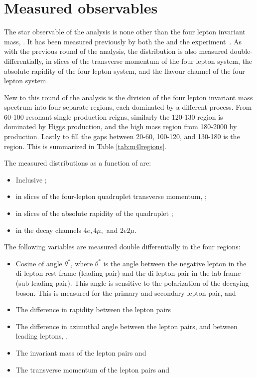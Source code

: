 \section{Measured observables}

The star observable of the analysis is none other than the four lepton invariant mass, \mFourL. It has been measured previously by both the \ATLAS and the \CMS experiment~\cite{Aad:2014tca,Aad:2015rka,Aaboud:2019lxo}. As with the previous round of the analysis, the \mFourL{} distribution is also measured double-differentially, in slices of the transverse momentum of the four lepton system, the absolute rapidity of the four lepton system, and the flavour channel of the four lepton system. 

New to this round of the analysis is the division of the four lepton invariant mass spectrum into four separate regions, each dominated by a different process. From \unit{60}{\GeV}-\unit{100}{\GeV} resonant single \Z production reigns, similarly the \unit{120}{\GeV}-\unit{130}{\GeV} region is dominated by Higgs production, and the high mass region from \unit{180}{\GeV}-\unit{2000}{\GeV} by \onshellZZ{} production. Lastly to fill the gaps between  \unit{20}{\GeV}-\unit{60}{\GeV}, \unit{100}{\GeV}-\unit{120}{\GeV}, and \unit{130}{\GeV}-\unit{180}{\GeV} is the \offshellZZ{} region. This is summarized in Table \ref{tab:m4lregions}. 

The measured distributions as a function of \mFourL{} are:
\begin{itemize}
    \item Inclusive \mFourL{};
    \item \mFourL{} in slices of the four-lepton quadruplet transverse momentum, \ptFourL{};
    \item \mFourL{} in slices of the absolute rapidity of the quadruplet \yFourL{};
    \item \mFourL{} in the decay channels $4e, 4\mu, $ and $2e2\mu$.
\end{itemize}
The following variables are measured double differentially in the four \mFourL{} regions:
\begin{itemize}
    \item Cosine of angle $\theta^{*}$, where $\theta^{*}$ is the angle between the negative lepton in the di-lepton rest frame (leading pair) and the di-lepton pair in the lab frame (sub-leading pair). This angle is sensitive to the polarization of the decaying boson. This is measured for the primary and secondary lepton pair, \CTSOneTwo and \CTSThreeFour
    \item The difference in rapidity between the lepton pairs \dYPairs
    \item The difference in azimuthal angle between the lepton pairs, and between leading leptons, \dPhiPairs, \dPhill
    \item The invariant mass of the lepton pairs \mZOne and \mZTwo
    \item The transverse momentum of the lepton pairs \ptZOne and \ptZTwo
\end{itemize}

